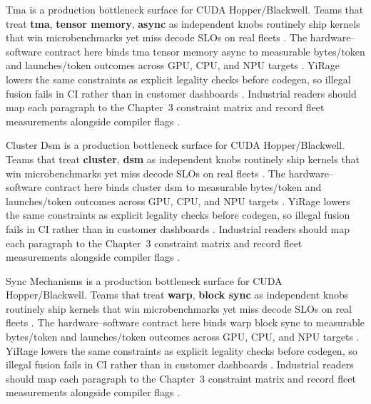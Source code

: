 Tma is a production bottleneck surface for CUDA Hopper/Blackwell. Teams that treat \textbf{tma}, \textbf{tensor memory}, \textbf{async} as independent knobs routinely ship kernels that win microbenchmarks yet miss decode SLOs on real fleets \citep{patel2025llminference,nvidia2022hopper}. The hardware--software contract here binds tma tensor memory async to measurable bytes/token and launches/token outcomes across GPU, CPU, and NPU targets \citep{taxbreak2026,semianalysis2024tma}. YiRage lowers the same constraints as explicit legality checks before codegen, so illegal fusion fails in CI rather than in customer dashboards \citep{memoryfloor2026,amd2024xdna}. Industrial readers should map each paragraph to the Chapter~3 constraint matrix and record fleet measurements alongside compiler flags \citep{nvidia2022hopper,amd2024aie}.

Cluster Dsm is a production bottleneck surface for CUDA Hopper/Blackwell. Teams that treat \textbf{cluster}, \textbf{dsm} as independent knobs routinely ship kernels that win microbenchmarks yet miss decode SLOs on real fleets \citep{taxbreak2026,semianalysis2024tma}. The hardware--software contract here binds cluster dsm to measurable bytes/token and launches/token outcomes across GPU, CPU, and NPU targets \citep{memoryfloor2026,amd2024xdna}. YiRage lowers the same constraints as explicit legality checks before codegen, so illegal fusion fails in CI rather than in customer dashboards \citep{nvidia2022hopper,amd2024aie}. Industrial readers should map each paragraph to the Chapter~3 constraint matrix and record fleet measurements alongside compiler flags \citep{semianalysis2024tma,dlbook}.

Sync Mechanisms is a production bottleneck surface for CUDA Hopper/Blackwell. Teams that treat \textbf{warp}, \textbf{block sync} as independent knobs routinely ship kernels that win microbenchmarks yet miss decode SLOs on real fleets \citep{memoryfloor2026,amd2024xdna}. The hardware--software contract here binds warp block sync to measurable bytes/token and launches/token outcomes across GPU, CPU, and NPU targets \citep{nvidia2022hopper,amd2024aie}. YiRage lowers the same constraints as explicit legality checks before codegen, so illegal fusion fails in CI rather than in customer dashboards \citep{semianalysis2024tma,dlbook}. Industrial readers should map each paragraph to the Chapter~3 constraint matrix and record fleet measurements alongside compiler flags \citep{amd2024xdna,dao2022flashattention}.

